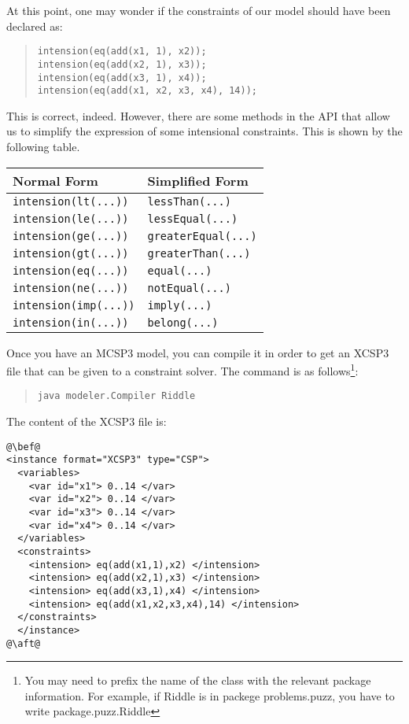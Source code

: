 \documentclass[10pt]{article}
\def\xt{{\rm XCSP3}\xspace}
\def\mt{{\rm MCSP3}\xspace}
\def\xt{{\rm XCSP3}\xspace}
\begin{document}
At this point, one may wonder if the constraints of our model should have been declared as:

\begin{quote}
\begin{verbatim}
intension(eq(add(x1, 1), x2));
intension(eq(add(x2, 1), x3));
intension(eq(add(x3, 1), x4));
intension(eq(add(x1, x2, x3, x4), 14));
\end{verbatim}
\end{quote}

This is correct, indeed.
However, there are some methods in the API that allow us to simplify the expression of some intensional constraints.
This is shown by the following table.

\medskip\begin{tabular}{ll}
  \toprule
Normal Form & Simplified Form \\
  \midrule
  \verb!intension(lt(...))! & \verb!lessThan(...)!  \\
  \verb!intension(le(...))! & \verb!lessEqual(...)!  \\
  \verb!intension(ge(...))! & \verb!greaterEqual(...)!  \\
  \verb!intension(gt(...))! & \verb!greaterThan(...)!  \\
  \verb!intension(eq(...))! & \verb!equal(...)!  \\
  \verb!intension(ne(...))! & \verb!notEqual(...)!  \\
  \verb!intension(imp(...))! & \verb!imply(...)!  \\
 \verb!intension(in(...))! & \verb!belong(...)!  \\
\bottomrule
\end{tabular}
\bigskip

Once you have an \mt model, you can compile it in order to get an \xt file that can be given to a constraint solver.
The command is as follows\footnote{You may need to prefix the name of the class with the relevant package information. For example, if Riddle is in packege problems.puzz, you have to write package.puzz.Riddle}:
\begin{quote}
\begin{verbatim}
java modeler.Compiler Riddle
\end{verbatim}
\end{quote}



The content of the \xt file is: 

\begin{lstlisting}
@\bef@
<instance format="XCSP3" type="CSP">
  <variables>
    <var id="x1"> 0..14 </var>
    <var id="x2"> 0..14 </var>
    <var id="x3"> 0..14 </var>
    <var id="x4"> 0..14 </var>
  </variables>
  <constraints>
    <intension> eq(add(x1,1),x2) </intension>
    <intension> eq(add(x2,1),x3) </intension>
    <intension> eq(add(x3,1),x4) </intension>
    <intension> eq(add(x1,x2,x3,x4),14) </intension>
  </constraints>
  </instance>
@\aft@
\end{lstlisting}
\end{document}
